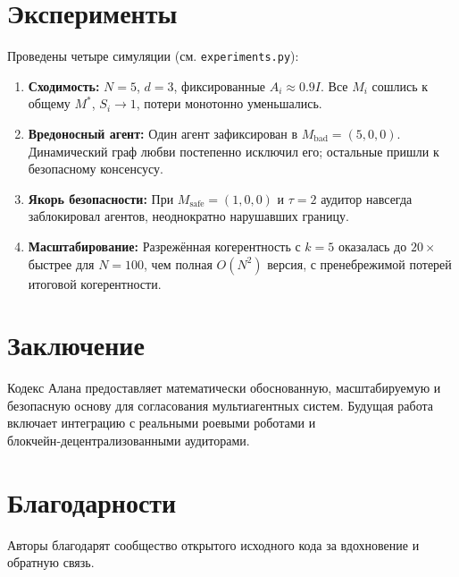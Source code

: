 \documentclass{article}
\begin{document}
\section{Эксперименты}
Проведены четыре симуляции (см. \texttt{experiments.py}):
\begin{enumerate}
    \item \textbf{Сходимость:} $N=5$, $d=3$, фиксированные $A_i\approx 0.9I$. Все $M_i$ сошлись к общему $M^*$, $S_i\to 1$, потери монотонно уменьшались.
    \item \textbf{Вредоносный агент:} Один агент зафиксирован в $M_{\text{bad}} = (5,0,0)$. Динамический граф любви постепенно исключил его; остальные пришли к безопасному консенсусу.
    \item \textbf{Якорь безопасности:} При $M_{\text{safe}} = (1,0,0)$ и $\tau=2$ аудитор навсегда заблокировал агентов, неоднократно нарушавших границу.
    \item \textbf{Масштабирование:} Разрежённая когерентность с $k=5$ оказалась до $20\times$ быстрее для $N=100$, чем полная $O(N^2)$ версия, с пренебрежимой потерей итоговой когерентности.
\end{enumerate}

\section{Заключение}
Кодекс Алана предоставляет математически обоснованную, масштабируемую и безопасную основу для согласования мультиагентных систем. Будущая работа включает интеграцию с реальными роевыми роботами и блокчейн‑децентрализованными аудиторами.

\section*{Благодарности}
Авторы благодарят сообщество открытого исходного кода за вдохновение и обратную связь.
\end{document}

